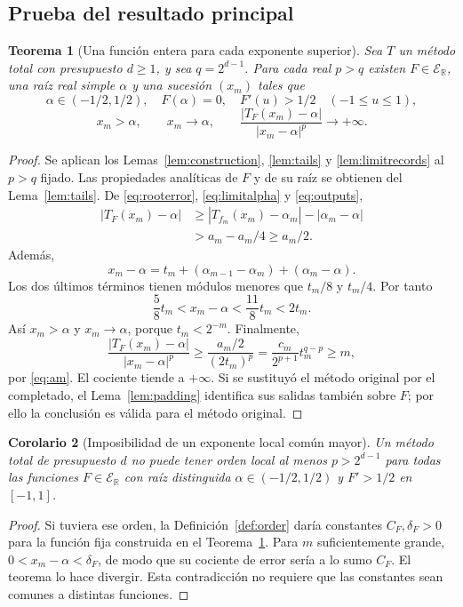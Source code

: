 \documentclass[11pt,a4paper]{article}
\numberwithin{equation}{section}
\newtheorem{theorem}{Teorema}[section]
\newtheorem{corollary}[theorem]{Corolario}
\theoremstyle{definition}
\theoremstyle{remark}
\newcommand{\R}{\mathbb R}
\newcommand{\ER}{\mathcal E_{\R}}
\begin{document}
\subsection{Prueba del resultado principal}
\begin{theorem}[Una función entera para cada exponente superior]\label{thm:main}
Sea $T$ un método total con presupuesto $d\ge1$, y sea $q=2^{d-1}$. Para cada real $p>q$ existen $F\in\ER$, una raíz real simple $\alpha$ y una sucesión $(x_m)$ tales que
\[
\alpha\in(-1/2,1/2),\quad F(\alpha)=0,\quad
F'(u)>1/2\quad(-1\le u\le1),
\]
\[
x_m>\alpha,\qquad x_m\longrightarrow\alpha,
\qquad
\frac{|T_F(x_m)-\alpha|}{|x_m-\alpha|^p}\longrightarrow+\infty.
\]
\end{theorem}
\begin{proof}
Se aplican los Lemas~\ref{lem:construction}, \ref{lem:tails} y \ref{lem:limitrecords} al $p>q$ fijado. Las propiedades analíticas de $F$ y de su raíz se obtienen del Lema~\ref{lem:tails}. De \eqref{eq:rooterror}, \eqref{eq:limitalpha} y \eqref{eq:outputs},
\begin{align*}
|T_F(x_m)-\alpha|
&\ge|T_{f_m}(x_m)-\alpha_m|-|\alpha_m-\alpha|\\
&>a_m-a_m/4\ge a_m/2.
\end{align*}
Además,
\[
x_m-\alpha=t_m+(\alpha_{m-1}-\alpha_m)+(\alpha_m-\alpha).
\]
Los dos últimos términos tienen módulos menores que $t_m/8$ y $t_m/4$. Por tanto
\begin{equation}\label{eq:positiveerror}
\frac58t_m<x_m-\alpha<\frac{11}{8}t_m<2t_m.
\end{equation}
Así $x_m>\alpha$ y $x_m\to\alpha$, porque $t_m<2^{-m}$. Finalmente,
\[
\frac{|T_F(x_m)-\alpha|}{|x_m-\alpha|^p}
\ge\frac{a_m/2}{(2t_m)^p}
=\frac{c_m}{2^{p+1}}t_m^{q-p}\ge m,
\]
por \eqref{eq:am}. El cociente tiende a $+\infty$. Si se sustituyó el método original por el completado, el Lema~\ref{lem:padding} identifica sus salidas también sobre $F$; por ello la conclusión es válida para el método original.
\end{proof}

\begin{corollary}[Imposibilidad de un exponente local común mayor]\label{cor:totalbound}
Un método total de presupuesto $d$ no puede tener orden local al menos $p>2^{d-1}$ para todas las funciones $F\in\ER$ con raíz distinguida $\alpha\in(-1/2,1/2)$ y $F'>1/2$ en $[-1,1]$.
\end{corollary}
\begin{proof}
Si tuviera ese orden, la Definición~\ref{def:order} daría constantes $C_F,\delta_F>0$ para la función fija construida en el Teorema~\ref{thm:main}. Para $m$ suficientemente grande, $0<x_m-\alpha<\delta_F$, de modo que su cociente de error sería a lo sumo $C_F$. El teorema lo hace divergir. Esta contradicción no requiere que las constantes sean comunes a distintas funciones.
\end{proof}
\end{document}
